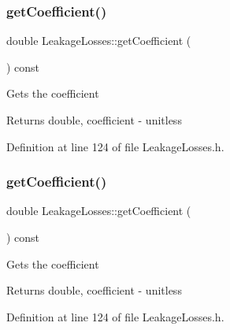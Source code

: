 \mbox{\label{class_leakage_losses_a7f70af7175574e0c4447a322586ac01e}} 
\subsubsection{\texorpdfstring{get\+Coefficient()}{getCoefficient()}\hspace{0.1cm}{\footnotesize\ttfamily [1/3]}}
{\footnotesize\ttfamily double Leakage\+Losses\+::get\+Coefficient (\begin{DoxyParamCaption}{ }\end{DoxyParamCaption}) const\hspace{0.3cm}{\ttfamily [inline]}}

Gets the coefficient \begin{DoxyReturn}{Returns}
double, coefficient -\/ unitless 
\end{DoxyReturn}


Definition at line 124 of file Leakage\+Losses.\+h.

\mbox{\label{class_leakage_losses_a7f70af7175574e0c4447a322586ac01e}} 
\subsubsection{\texorpdfstring{get\+Coefficient()}{getCoefficient()}\hspace{0.1cm}{\footnotesize\ttfamily [2/3]}}
{\footnotesize\ttfamily double Leakage\+Losses\+::get\+Coefficient (\begin{DoxyParamCaption}{ }\end{DoxyParamCaption}) const\hspace{0.3cm}{\ttfamily [inline]}}

Gets the coefficient \begin{DoxyReturn}{Returns}
double, coefficient -\/ unitless 
\end{DoxyReturn}


Definition at line 124 of file Leakage\+Losses.\+h.

\mbox{\label{class_leakage_losses_a7f70af7175574e0c4447a322586ac01e}} 
